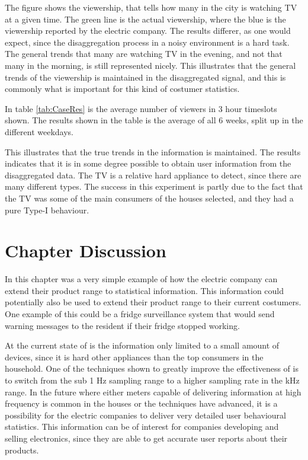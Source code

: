 The figure shows the viewership, that tells how many in the city is watching TV at a given time. The green line is the actual viewership, where the blue is the viewership reported by the electric company. The results differer, as one would expect, since the disaggregation process in a noisy environment is a hard task. The general trends that many are watching TV in the evening, and not that many in the morning, is still represented nicely. This illustrates that the general trends of the viewership is maintained in the disaggregated signal, and this is commonly what is important for this kind of costumer statistics. 

In table \ref{tab:CaseRes} is the average number of viewers in 3 hour timeslots shown. The results shown in the table is the average of all 6 weeks, split up in the different weekdays. 



This illustrates that the true trends in the information is maintained. The results indicates that it is in some degree possible to obtain user information from the disaggregated data. The TV is a relative hard appliance to detect, since there are many different types. The success in this experiment is partly due to the fact that the TV was some of the main consumers of the houses selected, and they had a pure Type-I behaviour.

\section{Chapter Discussion}
In this chapter was a very simple example of how the electric company can extend their product range to statistical information. This information could potentially also be used to extend their product range to their current costumers. One example of this could be a fridge surveillance system that would send warning messages to the resident if their fridge stopped working.

At the current state of  is the information only limited to a small amount of devices, since it is hard other appliances than the top consumers in the household. One of the techniques shown to greatly improve the effectiveness of  is to switch from the sub 1 Hz sampling range to a higher sampling rate in the kHz range. In the future where either meters capable of delivering information at high frequency is common in the houses or the  techniques have advanced, it is a possibility for the electric companies to deliver very detailed user behavioural statistics. This information can be of interest for companies developing and selling electronics, since they are able to get accurate user reports about their products. 

